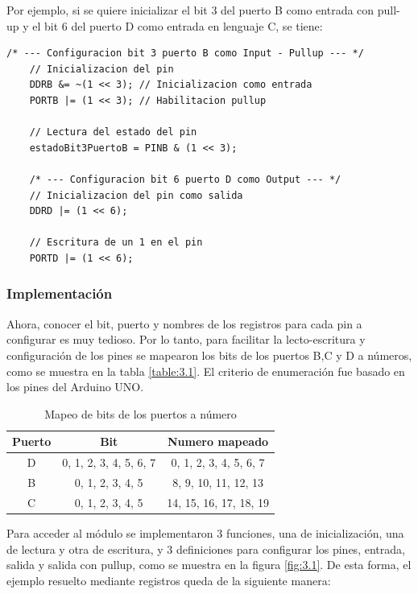 Por ejemplo, si se quiere inicializar el bit 3 del puerto B como entrada con pull-up y el bit 6 del puerto D como entrada en lenguaje C, se tiene:

\begin{lstlisting}[style=CStyle]
	/* --- Configuracion bit 3 puerto B como Input - Pullup --- */
	// Inicializacion del pin
	DDRB &= ~(1 << 3); // Inicializacion como entrada
	PORTB |= (1 << 3); // Habilitacion pullup
	
	// Lectura del estado del pin
	estadoBit3PuertoB = PINB & (1 << 3);
	
	/* --- Configuracion bit 6 puerto D como Output --- */
	// Inicializacion del pin como salida
	DDRD |= (1 << 6); 
	
	// Escritura de un 1 en el pin
	PORTD |= (1 << 6); 
\end{lstlisting}

\subsubsection{Implementación}

Ahora, conocer el bit, puerto y nombres de los registros para cada pin a configurar es muy tedioso. Por lo tanto, para facilitar la lecto-escritura y configuración de los pines se mapearon los bits de los puertos B,C y D a números, como se muestra en la tabla \ref{table:3.1}. El criterio de enumeración fue basado en los pines del Arduino UNO.

\begin{table}[!ht]
	\begin{center}
		\begin{tabular}{|c|c|c|}
			\hline
			\textbf{Puerto} & \textbf{Bit} & \textbf{Numero mapeado} \\
			\hline \hline
			D & 0, 1, 2, 3, 4, 5, 6, 7 & 0, 1, 2, 3, 4, 5, 6, 7 \\
			\hline
			B & 0, 1, 2, 3, 4, 5 & 8, 9, 10, 11, 12, 13 \\
			\hline
			C & 0, 1, 2, 3, 4, 5 & 14, 15, 16, 17, 18, 19\\
			\hline
		\end{tabular}
	\end{center}
	\caption{Mapeo de bits de los puertos a número}
	\label{table:\thetable}
\end{table}

Para acceder al módulo se implementaron 3 funciones, una de inicialización, una de  lectura y otra de  escritura, y 3 definiciones para configurar los pines, entrada, salida y salida con pullup, como se muestra en la figura \ref{fig:3.1}. De esta forma, el ejemplo resuelto mediante registros queda de la siguiente manera:

